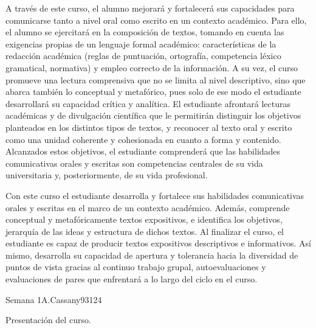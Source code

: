 \begin{syllabus}


\begin{justification}
A través de este curso, el alumno mejorará y fortalecerá sus capacidades para comunicarse tanto a nivel oral como escrito en un contexto académico. Para ello, el alumno se ejercitará en la composición de textos, tomando en cuenta las exigencias propias de un lenguaje formal académico: características de la redacción académica (reglas de puntuación, ortografía, competencia léxico gramatical, normativa) y empleo correcto de la información. A su vez, el curso promueve una lectura comprensiva que no se limita al nivel descriptivo, sino que abarca también lo conceptual y metafórico, pues solo de ese modo el estudiante desarrollará su capacidad crítica y analítica. El estudiante afrontará lecturas académicas y de divulgación científica que le permitirán distinguir los objetivos planteados en los distintos tipos de textos, y reconocer al texto oral y escrito como una unidad coherente y cohesionada en cuanto a forma y contenido. Alcanzados estos objetivos, el estudiante comprenderá que las habilidades comunicativas orales y escritas son competencias centrales de su vida universitaria y, posteriormente, de su vida profesional. 
\end{justification}

\begin{goals}
\item Con este curso el estudiante desarrolla y fortalece sus habilidades comunicativas orales y escritas en el marco de un contexto académico. Además, comprende conceptual y metafóricamente textos expositivos, e identifica los objetivos, jerarquía de las ideas y estructura de dichos textos. Al finalizar el curso, el estudiante es capaz de producir textos expositivos descriptivos e informativos. Así mismo, desarrolla su capacidad de apertura y tolerancia hacia la diversidad de puntos de vista gracias al continuo trabajo grupal, autoevaluaciones y evaluaciones de pares que enfrentará a lo largo del ciclo en el curso. 
\end{goals}

\begin{outcomes}   
\end{outcomes}

\begin{unit}{Semana 1A.}{Cassany93}{12}{4}
   \begin{topics}
      \item Presentación del curso.
   \end{topics}
   \begin{unitgoals}
      \item
   \end{unitgoals}
\end{unit}


\end{syllabus}
